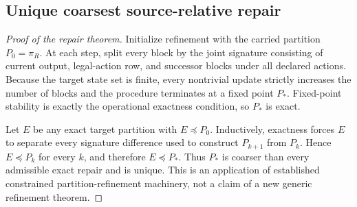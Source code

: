 \subsection{Unique coarsest source-relative repair}
\begin{proof}[Proof of the repair theorem]
Initialize refinement with the carried partition $P_0=\pi_R$. At each step, split every block by the joint signature consisting of current output, legal-action row, and successor blocks under all declared actions. Because the target state set is finite, every nontrivial update strictly increases the number of blocks and the procedure terminates at a fixed point $P_*$. Fixed-point stability is exactly the operational exactness condition, so $P_*$ is exact.

Let $E$ be any exact target partition with $E\preceq P_0$. Inductively, exactness forces $E$ to separate every signature difference used to construct $P_{k+1}$ from $P_k$. Hence $E\preceq P_k$ for every $k$, and therefore $E\preceq P_*$. Thus $P_*$ is coarser than every admissible exact repair and is unique. This is an application of established constrained partition-refinement machinery, not a claim of a new generic refinement theorem.
\end{proof}

